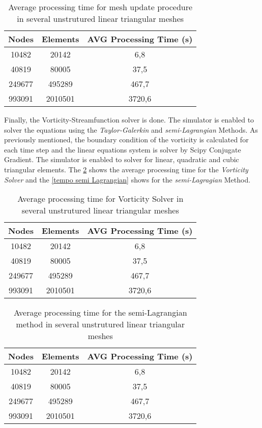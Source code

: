 \vspace{0.5cm}
\begin{table}[H]
\centering
\begin{tabular}{ccc}
\toprule
\textbf{Nodes} & \textbf{Elements} & \textbf{AVG Processing Time} (s) \\
\midrule
10482 & 20142 & 6,8 \\
40819 & 80005 & 37,5 \\
249677 & 495289 & 467,7 \\
993091 & 2010501 & 3720,6 \\
\bottomrule
\end{tabular}
\caption{Average processing time for mesh update procedure in several unstrutured linear triangular meshes}
\label{tempo mesh update}
\end{table}


\medskip
Finally, the Vorticity-Streamfunction solver is done. 
The simulator is enabled to solver the equations using the
\textit{Taylor-Galerkin} and \textit{semi-Lagrangian} Methods.
As previously mentioned, the boundary condition of the vorticity
is calculated for each time step and 
the linear equations system is solver by Scipy Conjugate Gradient.
The simulator is enabled to solver for linear, quadratic and cubic
triangular elements. The \ref{tempo vorticity solver} 
shows the average processing time for the \textit{Vorticity Solver}
and the \ref{tempo semi Lagrangian} 
shows for the \textit{semi-Lagragian} Method.

\vspace{0.5cm}
\begin{table}[H]
\centering
\begin{tabular}{ccc}
\toprule
\textbf{Nodes} & \textbf{Elements} & \textbf{AVG Processing Time} (s) \\
\midrule
10482 & 20142 & 6,8 \\
40819 & 80005 & 37,5 \\
249677 & 495289 & 467,7 \\
993091 & 2010501 & 3720,6 \\
\bottomrule
\end{tabular}
\caption{Average processing time for Vorticity Solver in several unstrutured linear triangular meshes}
\label{tempo vorticity solver}
\end{table}


\vspace{0.5cm}
\begin{table}[H]
\centering
\begin{tabular}{ccc}
\toprule
\textbf{Nodes} & \textbf{Elements} & \textbf{AVG Processing Time} (s) \\
\midrule
10482 & 20142 & 6,8 \\
40819 & 80005 & 37,5 \\
249677 & 495289 & 467,7 \\
993091 & 2010501 & 3720,6 \\
\bottomrule
\end{tabular}
\caption{Average processing time for the semi-Lagrangian method in several unstrutured linear triangular meshes}
\label{tempo semi lagrangian}
\end{table}


